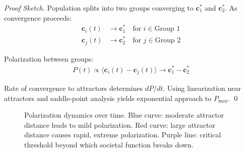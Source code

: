 \documentclass[11pt,a4paper]{article}
\theoremstyle{definition}
\theoremstyle{remark}
\newcommand{\cc}{\mathbf{c}}
\begin{document}
\begin{small}
\begin{enumerate}
\begin{proof}[Proof Sketch]
Population splits into two groups converging to \(\cc^*_1\) and \(\cc^*_2\). As convergence proceeds:
\begin{align}
\cc_i(t) &\to \cc^*_1 \quad \text{for } i \in \text{Group 1} \\
\cc_j(t) &\to \cc^*_2 \quad \text{for } j \in \text{Group 2}
\end{align}

Polarization between groups:
\begin{align}
P(t) \propto \langle \cc_i(t) - \cc_j(t) \rangle \to \cc^*_1 - \cc^*_2
\end{align}

Rate of convergence to attractors determines \(dP/dt\). Using linearization near attractors and saddle-point analysis yields exponential approach to \(P_{\max}\). \qed
\end{proof}

\begin{figure}[H]
\centering
{}
\caption{Polarization dynamics over time. Blue curve: moderate attractor distance leads to mild polarization. Red curve: large attractor distance causes rapid, extreme polarization. Purple line: critical threshold beyond which societal function breaks down.}
\label{fig:polarization_dynamics}
\end{figure}


\end{enumerate}
\end{small}
\end{document}
